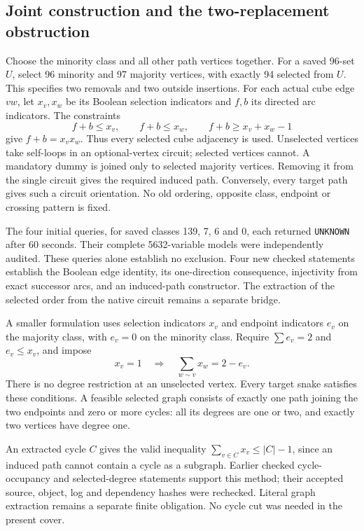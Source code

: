 \documentclass[11pt,a4paper]{article}
\theoremstyle{definition}
\theoremstyle{remark}
\begin{document}
\subsection{Joint construction and the two-replacement obstruction}
\label{sec:joint235}
Choose the minority class and all other path vertices together. For a
saved 96-set $U$, select 96 minority and 97 majority vertices, with
exactly 94 selected from $U$. This specifies two removals and two outside
insertions. For each actual cube edge $vw$, let $x_v,x_w$ be its Boolean
selection indicators and $f,b$ its directed arc indicators. The constraints
\[
 f+b\le x_v,\qquad f+b\le x_w,\qquad
 f+b\ge x_v+x_w-1
\]
give $f+b=x_vx_w$. Thus every selected cube adjacency is used. Unselected
vertices take self-loops in an optional-vertex circuit; selected vertices
cannot. A mandatory dummy is joined only to selected majority vertices.
Removing it from the single circuit gives the required induced path.
Conversely, every target path gives such a circuit orientation. No old
ordering, opposite class, endpoint or crossing pattern is fixed.

The four initial queries, for saved classes 139, 7, 6 and 0, each returned
\texttt{UNKNOWN} after 60 seconds. Their complete 5632-variable models
were independently audited. These queries alone establish no exclusion.
Four new checked statements establish the Boolean edge identity,
its one-direction consequence, injectivity from exact successor arcs,
and an induced-path constructor. The extraction of the selected order
from the native circuit remains a separate bridge.

A smaller formulation uses selection indicators $x_v$ and endpoint
indicators $e_v$ on the majority class, with $e_v=0$ on the minority class. Require
$\sum e_v=2$ and $e_v\le x_v$, and impose
\[
 x_v=1\quad\Longrightarrow\quad
 \sum_{w\sim v}x_w=2-e_v.
\]
There is no degree restriction at an unselected vertex. Every target
snake satisfies these conditions. A feasible selected graph consists
of exactly one path joining the two endpoints and zero or more cycles:
all its degrees are one or two, and exactly two vertices have degree one.

An extracted cycle $C$ gives the valid inequality
$\sum_{v\in C}x_v\le |C|-1$, since an induced path cannot contain a cycle
as a subgraph. Earlier checked cycle-occupancy and selected-degree
statements support this method; their accepted source, object, log and
dependency hashes were rechecked. Literal graph extraction remains a
separate finite obligation. No cycle cut was needed in the present cover.
\end{document}

